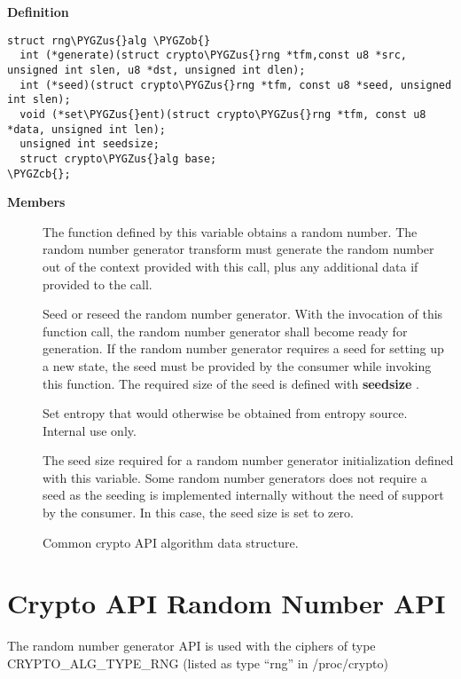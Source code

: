 \documentclass[a4paper,8pt,english]{sphinxmanual}
\def\PYGZus{\char`\_}
\def\PYGZob{\char`\{}
\def\PYGZcb{\char`\}}
\begin{document}
\textbf{Definition}

\begin{Verbatim}[commandchars=\\\{\}]
struct rng\PYGZus{}alg \PYGZob{}
  int (*generate)(struct crypto\PYGZus{}rng *tfm,const u8 *src, unsigned int slen, u8 *dst, unsigned int dlen);
  int (*seed)(struct crypto\PYGZus{}rng *tfm, const u8 *seed, unsigned int slen);
  void (*set\PYGZus{}ent)(struct crypto\PYGZus{}rng *tfm, const u8 *data, unsigned int len);
  unsigned int seedsize;
  struct crypto\PYGZus{}alg base;
\PYGZcb{};
\end{Verbatim}

\textbf{Members}
\begin{description}
\item[{}] \leavevmode
The function defined by this variable obtains a
random number. The random number generator transform
must generate the random number out of the context
provided with this call, plus any additional data
if provided to the call.

\item[{}] \leavevmode
Seed or reseed the random number generator.  With the
invocation of this function call, the random number
generator shall become ready for generation.  If the
random number generator requires a seed for setting
up a new state, the seed must be provided by the
consumer while invoking this function. The required
size of the seed is defined with \textbf{seedsize} .

\item[{}] \leavevmode
Set entropy that would otherwise be obtained from
entropy source.  Internal use only.

\item[{}] \leavevmode
The seed size required for a random number generator
initialization defined with this variable. Some
random number generators does not require a seed
as the seeding is implemented internally without
the need of support by the consumer. In this case,
the seed size is set to zero.

\item[{}] \leavevmode
Common crypto API algorithm data structure.

\end{description}


\section{Crypto API Random Number API}
\label{crypto/api-rng:crypto-api-random-number-api}
The random number generator API is used with the ciphers of type
CRYPTO\_ALG\_TYPE\_RNG (listed as type ``rng'' in /proc/crypto)
\end{document}
